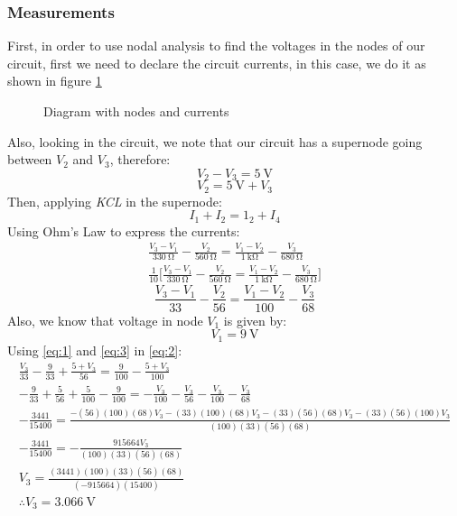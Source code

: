 \documentclass[letterpaper]{article}
\begin{document}
\subsubsection{Measurements}
First, in order to use nodal analysis to find the voltages in the nodes of our circuit, first we
need to declare the circuit currents, in this case, we do it as shown in figure \ref{fig:2}
\begin{figure}[H]
    \caption{Diagram with nodes and currents}
    \label{fig:2}
\end{figure}
Also, looking in the circuit, we note that our circuit has a supernode going between $V_2$ and
$V_3$, therefore:
\[V_2-V_3=\SI{5}{\volt}\]
\begin{equation}
    V_2 = \SI{5}{\volt}+V_3
    \label{eq:1}
\end{equation}
Then, applying \textit{KCL} in the supernode:
\[I_1+I_2=1_2+I_4\]
Using Ohm's Law to express the currents:
\begin{gather*}
    \frac{V_3-V_1}{\SI{330}{\ohm}}-\frac{V_2}{\SI{560}{\ohm}}=\frac{V_1-V_2}{\SI{1}{\kilo\ohm}}-\frac{V_3}{\SI{680}{\ohm}}\\
    \frac{1}{10}\Bigg[\frac{V_3-V_1}{\SI{330}{\ohm}}-\frac{V_2}{\SI{560}{\ohm}}=\frac{V_1-V_2}{\SI{1}{\kilo\ohm}}-\frac{V_3}{\SI{680}{\ohm}}\Bigg]
\end{gather*}
\begin{equation}
    \frac{V_3-V_1}{33}-\frac{V_2}{56}=\frac{V_1-V_2}{100}-\frac{V_3}{68}
    \label{eq:2}
\end{equation}
Also, we know that voltage in node $V_1$ is given by:
\begin{equation}
    V_1=\SI{9}{\volt}
    \label{eq:3}
\end{equation}
Using \eqref{eq:1} and \eqref{eq:3} in \eqref{eq:2}:
\begin{gather*}
    \frac{V_3}{33}-\frac{9}{33}+\frac{5+V_3}{56}=\frac{9}{100}-\frac{5+V_3}{100}\\
    -\frac{9}{33}+\frac{5}{56}+\frac{5}{100}-\frac{9}{100}=-\frac{V_3}{100}-\frac{V_3}{56}-\frac{V_3}{100}-\frac{V_3}{68}\\
    -\frac{3441}{15400}=\frac{-(56)(100)(68)V_3-(33)(100)(68)V_3-(33)(56)(68)V_3-(33)(56)(100)V_3}{(100)(33)(56)(68)}\\
    -\frac{3441}{15400}=-\frac{915664V_3}{(100)(33)(56)(68)}\\
    V_3=\frac{(3441)(100)(33)(56)(68)}{(-915664)(15400)}\\
    \therefore V_3=\SI{3.066}{\volt}
\end{gather*}
\end{document}
